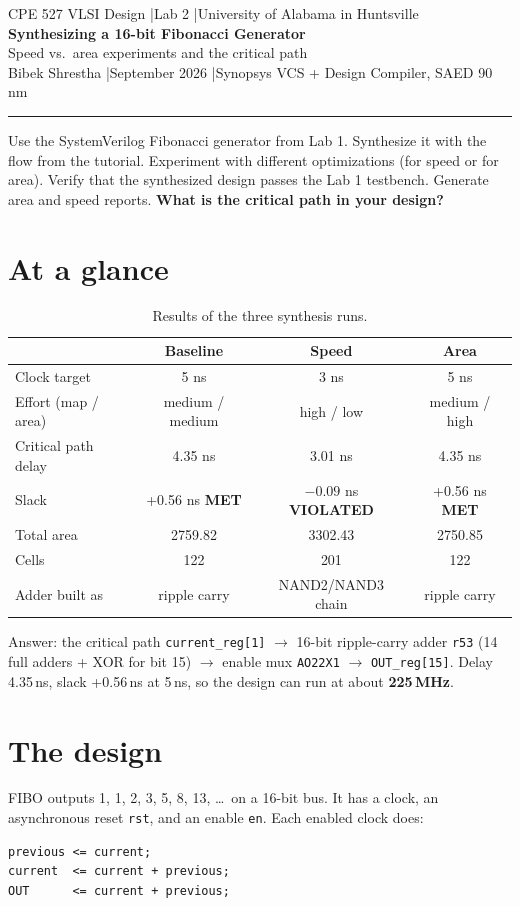 \documentclass[11pt,a4paper]{article}
\newcommand{\met}{\textcolor{okgreen}{\textbf{MET}}}
\newcommand{\viol}{\textcolor{badred}{\textbf{VIOLATED}}}
\newcommand{\header}[3]{%
  \begin{center}
  {\small\color{cm} CPE 527 VLSI Design \quad|\quad Lab 2 \quad|\quad University of Alabama in Huntsville}\\[8pt]
  {\LARGE\bfseries\color{accent} #1}\\[4pt]
  {\large #2}\\[8pt]
  {\small Bibek Shrestha \quad|\quad September 2026 \quad|\quad #3}
  \end{center}\vspace{2pt}\hrule\vspace{6pt}}
\begin{document}
\header{Synthesizing a 16-bit Fibonacci Generator}{Speed vs.\ area experiments and the critical path}{Synopsys VCS + Design Compiler, SAED 90\,nm}

\begin{task}
Use the SystemVerilog Fibonacci generator from Lab 1. Synthesize it with the flow from the tutorial.
Experiment with different optimizations (for speed or for area). Verify that the synthesized design
passes the Lab 1 testbench. Generate area and speed reports. \textbf{What is the critical path in your design?}
\end{task}

\section*{At a glance}
\begin{table}[H]\centering\small
\begin{tabular}{lccc}
\toprule
 & \textbf{Baseline} & \textbf{Speed} & \textbf{Area} \\
\midrule
Clock target & 5 ns & 3 ns & 5 ns \\
Effort (map / area) & medium / medium & high / low & medium / high \\
Critical path delay & 4.35 ns & 3.01 ns & 4.35 ns \\
Slack & +0.56 ns \met & $-0.09$ ns \viol & +0.56 ns \met \\
Total area & 2759.82 & 3302.43 & 2750.85 \\
Cells & 122 & 201 & 122 \\
Adder built as & ripple carry & NAND2/NAND3 chain & ripple carry \\
\bottomrule
\end{tabular}
\caption{Results of the three synthesis runs.}
\end{table}

\begin{keypoint}{Answer: the critical path}
\texttt{current\_reg[1]} $\rightarrow$ 16-bit ripple-carry adder \texttt{r53} (14 full adders + XOR for bit 15)
$\rightarrow$ enable mux \texttt{AO22X1} $\rightarrow$ \texttt{OUT\_reg[15]}.
Delay 4.35\,ns, slack +0.56\,ns at 5\,ns, so the design can run at about \textbf{225\,MHz}.
\end{keypoint}

\section{The design}
FIBO outputs 1, 1, 2, 3, 5, 8, 13, \dots\ on a 16-bit bus. It has a clock, an asynchronous reset
\texttt{rst}, and an enable \texttt{en}. Each enabled clock does:
\begin{lstlisting}[language=SV]
previous <= current;
current  <= current + previous;
OUT      <= current + previous;
\end{lstlisting}
\end{document}

